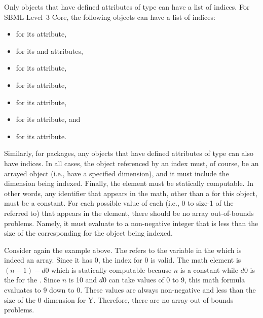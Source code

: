 Only objects that have defined attributes of  type can have a list of indices.   For SBML Level~3 Core, the following objects can have a list of indices:
\begin{itemize}
\item \Model for its  attribute,
\item \Species for its  and  attributes,
\item \Reaction for its  attribute,
\item \InitialAssignment for its  attribute,
\item \Rule for its  attribute,
\item \SpeciesReference for its  attribute, and
\item \EventAssignment for its  attribute.
\end{itemize}
Similarly, for packages, any objects that have defined attributes of  type can also have indices.   In all cases, the object referenced by an index must, of course, be an arrayed object (i.e., have a specified dimension), and it must include the dimension being indexed.
Finally, the  element must be statically computable.   In other words, any identifier that appears in the math, other than a \Dimension {} for this object, must be a constant.   For each possible value of each \Dimension {}  (i.e., 0 to size-1 of the \Dimension referred to) that appears in the  element, there should be no array out-of-bounds problems.   Namely, it must evaluate to a non-negative integer that is less than the size of the corresponding \Dimension for the object being indexed.    

Consider again the example above.   The \Index refers to the variable in the \AssignmentRule which is indeed an array.   Since it has  0, the index for  0 is valid.   The math element is $(n-1)  - d0$ which is statically computable because $n$ is a constant \Parameter while $d0$ is the \Dimension {} for the \AssignmentRule.   Since $n$ is 10 and $d0$ can take values of 0 to 9, this math formula evaluates to 9 down to 0.   These values are always non-negative and less than the size of the 0 dimension for Y.   Therefore, there are no array out-of-bounds problems.

